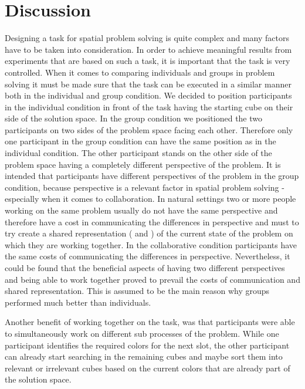 \section{Discussion}\label{discussion}

Designing a task for spatial problem solving is quite complex and many factors have to be taken into consideration. In order to achieve meaningful results from experiments that are based on such a task, it is important that the task is very controlled. When it comes to comparing individuals and groups in problem solving it must be made sure that the task can be executed in a similar manner both in the individual and group condition. We decided to position participants in the individual condition in front of the task having the starting cube on their side of the solution space. In the group condition we positioned the two participants on two sides of the problem space facing each other. Therefore only one participant in the group condition can have the same position as in the individual condition. The other participant stands on the other side of the problem space having a completely different perspective of the problem. It is intended that participants have different perspectives of the problem in the group condition, because perspective is a relevant factor in spatial problem solving - especially when it comes to collaboration. \cite{Amorim2003} In natural settings two or more people working on the same problem usually do not have the same perspective and therefore have a cost in communicating the differences in perspective and must to try create a shared representation (\cite{Roschelle1995} and \cite{Frankenstein2012}) of the current state of the problem on which they are working together. In the collaborative condition participants have the same costs of communicating the differences in perspective. Nevertheless, it could be found that the beneficial aspects of having two different perspectives and being able to work together proved to prevail the costs of communication and shared representation. This is assumed to be the main reason why groups performed much better than individuals.

Another benefit of working together on the task, was that participants were able to simultaneously work on different sub processes of the problem. While one participant identifies the required colors for the next slot, the other participant can already start searching in the remaining cubes and maybe sort them into relevant or irrelevant cubes based on the current colors that are already part of the solution space.

